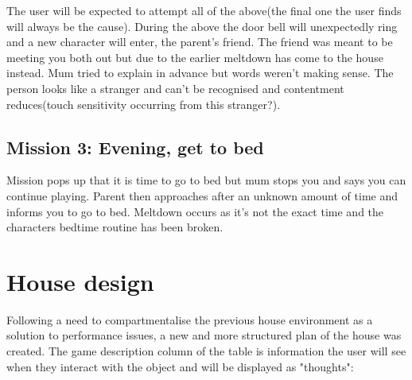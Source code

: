 The user will be expected to attempt all of the above(the final one the user finds will always be the cause). During the above the door bell will unexpectedly ring and a new character will enter, the parent's friend. The friend was meant to be meeting you both out but due to the earlier meltdown has come to the house instead. Mum tried to explain in advance but words weren't making sense. The person looks like a stranger and can't be recognised and contentment reduces(touch sensitivity occurring from this stranger?). 

\subsection*{Mission 3: Evening, get to bed}
Mission pops up that it is time to go to bed but mum stops you and says you can continue playing. Parent then approaches after an unknown amount of time and informs you to go to bed. Meltdown occurs as it's not the exact time and the characters bedtime routine has been broken.

\section{House design}
Following a need to compartmentalise the previous house environment as a solution to performance issues, a new and more structured plan of the house was created. The game description column of the table is information the user will see when they interact with the object and will be displayed as "thoughts":

